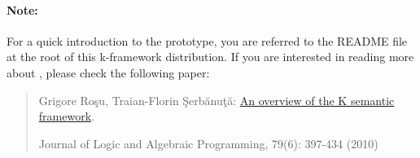 \begin{latexComment}
\paragraph{Note:}{
For a quick introduction to the \K prototype, you are referred to
the README file at the root of this k-framework distribution.  If you are
interested in reading more about \K, please check the following paper:
\begin{quote}
Grigore Ro\c su, Traian-Florin \c Serb\u anu\c t\u a:
\href{http://dx.doi.org/10.1016/j.jlap.2010.03.012}{An overview of the K semantic framework}.

Journal of Logic and Algebraic Programming, 79(6): 397-434 (2010)
\end{quote}
}
\end{latexComment}

\vspace*{3ex}
